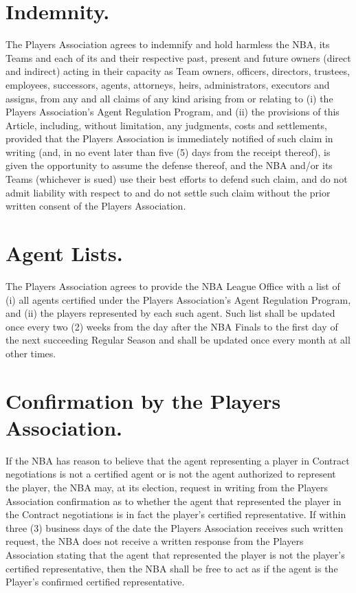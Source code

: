 \documentclass[
]{book}
\begin{document}
\hypertarget{indemnity.}{%
\section{Indemnity.}\label{indemnity.}}

The Players Association agrees to indemnify and hold harmless the NBA, its Teams and each of its and their respective past, present and future owners (direct and indirect) acting in their capacity as Team owners, officers, directors, trustees, employees, successors, agents, attorneys, heirs, administrators, executors and assigns, from any and all claims of any kind arising from or relating to (i) the Players Association's Agent Regulation Program, and (ii) the provisions of this Article, including, without limitation, any judgments, costs and settlements, provided that the Players Association is immediately notified of such claim in writing (and, in no event later than five (5) days from the receipt thereof), is given the opportunity to assume the defense thereof, and the NBA and/or its Teams (whichever is sued) use their best efforts to defend such claim, and do not admit liability with respect to and do not settle such claim without the prior written consent of the Players Association.

\hypertarget{agent-lists.}{%
\section{Agent Lists.}\label{agent-lists.}}

The Players Association agrees to provide the NBA League Office with a list of (i) all agents certified under the Players Association's Agent Regulation Program, and (ii) the players represented by each such agent. Such list shall be updated once every two (2) weeks from the day after the NBA Finals to the first day of the next succeeding Regular Season and shall be updated once every month at all other times.

\hypertarget{confirmation-by-the-players-association.}{%
\section{Confirmation by the Players Association.}\label{confirmation-by-the-players-association.}}

If the NBA has reason to believe that the agent representing a player in Contract negotiations is not a certified agent or is not the agent authorized to represent the player, the NBA may, at its election, request in writing from the Players Association confirmation as to whether the agent that represented the player in the Contract negotiations is in fact the player's certified representative. If within three (3) business days of the date the Players Association receives such written request, the NBA does not receive a written response from the Players Association stating that the agent that represented the player is not the player's certified representative, then the NBA shall be free to act as if the agent is the Player's confirmed certified representative.
\end{document}
